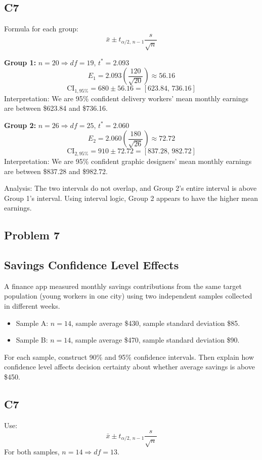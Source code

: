 \subsection*{C7}
Formula for each group:
\[
\bar{x} \pm t_{\alpha/2,\,n-1}\frac{s}{\sqrt{n}}
\]

\textbf{Group 1:} \(n=20\Rightarrow df=19\), \(t^*=2.093\)
\[
E_1=2.093\left(\frac{120}{\sqrt{20}}\right)\approx 56.16
\]
\[
\text{CI}_{1,95\%}=680\pm 56.16=[623.84,\,736.16]
\]
Interpretation: We are 95\% confident delivery workers' mean monthly earnings are between \$623.84 and \$736.16.

\textbf{Group 2:} \(n=26\Rightarrow df=25\), \(t^*=2.060\)
\[
E_2=2.060\left(\frac{180}{\sqrt{26}}\right)\approx 72.72
\]
\[
\text{CI}_{2,95\%}=910\pm 72.72=[837.28,\,982.72]
\]
Interpretation: We are 95\% confident graphic designers' mean monthly earnings are between \$837.28 and \$982.72.

Analysis: The two intervals do not overlap, and Group 2's entire interval is above Group 1's interval. Using interval logic, Group 2 appears to have the higher mean earnings.

\subsection*{Problem 7}
\subsection*{Savings Confidence Level Effects}
A finance app measured monthly savings contributions from the same target population (young workers in one city) using two independent samples collected in different weeks.
\begin{itemize}
  \item Sample A: \(n=14\), sample average \$430, sample standard deviation \$85.
  \item Sample B: \(n=14\), sample average \$470, sample standard deviation \$90.
\end{itemize}
For each sample, construct 90\% and 95\% confidence intervals. Then explain how confidence level affects decision certainty about whether average savings is above \$450.

\subsection*{C7}
Use:
\[
\bar{x} \pm t_{\alpha/2,\,n-1}\frac{s}{\sqrt{n}}
\]
For both samples, \(n=14\Rightarrow df=13\).

